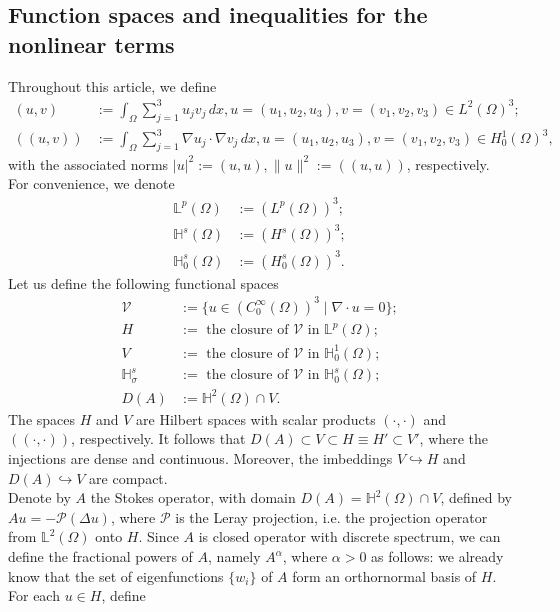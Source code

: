 \documentclass[reqno]{amsart}
\begin{document}
	\subsection{Function spaces and inequalities for the nonlinear terms}
	Throughout this article, we define
	\begin{align*}
		(u,v)&:=\int_{\Omega}\displaystyle\sum_{j=1}^{3}u_jv_j\,dx, u=(u_1,u_2,u_3),v=(v_1,v_2,v_3) \in L^2(\Omega)^3;\\
		((u,v))&:=\int_{\Omega}\displaystyle\sum_{j=1}^{3}\nabla u_j\cdot \nabla v_j\,dx, u=(u_1,u_2,u_3),v=(v_1,v_2,v_3) \in H_0^1(\Omega)^3,
	\end{align*}
	with the associated norms $|u|^2 :=(u,u), \|u\|^2:=((u,u))$, respectively. For convenience, we denote
	\begin{align*}
		\mathbb{L}^p(\Omega) &:= \left(L^p(\Omega)\right)^3; \\
		\mathbb{H}^s(\Omega) &:= \left(H^s(\Omega)\right)^3; \\
		\mathbb{H}^s_0(\Omega) &:= \left(H^s_0(\Omega)\right)^3.
	\end{align*}
	Let us define the following functional spaces
	\begin{align*}
		\mathcal{V} &:= \{u\in (C_{0}^{\infty}(\Omega))^3\mid  \nabla\cdot u=0\};\\
		H &:= \text{ the closure of $\mathcal{V}$ in }\mathbb{L}^p(\Omega);\\
		V &:= \text{ the closure of $\mathcal{V}$ in }\mathbb{H}^1_0(\Omega);\\
		\mathbb{H}^s_{\sigma} &:= \text{ the closure of $\mathcal{V}$ in }\mathbb{H}^s_0(\Omega);\\
		D(A)&:=\mathbb{H}^2(\Omega)\cap V.
	\end{align*}
	The spaces $H$ and $V$ are Hilbert spaces with scalar products $(\cdot,\cdot)$ and $((\cdot,\cdot))$, respectively. It follows that $D(A) \subset V \subset H \equiv H'\subset V'$, where the injections are dense and continuous. Moreover, the imbeddings $V \hookrightarrow H$ and $D(A) \hookrightarrow V$ are compact. \\
	Denote by $A$ the Stokes operator, with domain $D(A)=\mathbb{H}^2(\Omega)\cap V$, defined by $Au=-\mathcal{P}(\Delta u)$, where $\mathcal{P}$ is the Leray projection, i.e. the projection operator from $\mathbb{L}^2(\Omega)$ onto $H$.
	Since $A$ is closed operator with discrete spectrum, we can define the fractional powers of $A$, namely $A^\alpha$, where $\alpha>0$ as follows: we already know that the set of eigenfunctions $\{w_i\}$ of $A$ form an orthornormal basis of $H$. For each $u \in H$, define
\end{document}
